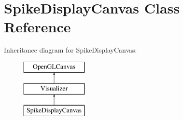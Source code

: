 \hypertarget{classSpikeDisplayCanvas}{\section{Spike\-Display\-Canvas Class Reference}
\label{classSpikeDisplayCanvas}
}
Inheritance diagram for Spike\-Display\-Canvas\-:\begin{figure}[H]
\begin{center}
\leavevmode
\includegraphics[height=3.000000cm]{classSpikeDisplayCanvas}
\end{center}
\end{figure}
